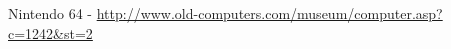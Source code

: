 \begin{thebibliography}{9} %
	Nintendo 64 - \url{http://www.old-computers.com/museum/computer.asp?c=1242&st=2}
\end{thebibliography}
